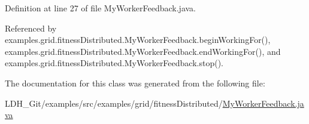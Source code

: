 Definition at line 27 of file My\-Worker\-Feedback.\-java.



Referenced by examples.\-grid.\-fitness\-Distributed.\-My\-Worker\-Feedback.\-begin\-Working\-For(), examples.\-grid.\-fitness\-Distributed.\-My\-Worker\-Feedback.\-end\-Working\-For(), and examples.\-grid.\-fitness\-Distributed.\-My\-Worker\-Feedback.\-stop().



The documentation for this class was generated from the following file\-:\begin{DoxyCompactItemize}
\item 
L\-D\-H\-\_\-\-Git/examples/src/examples/grid/fitness\-Distributed/\hyperlink{_my_worker_feedback_8java}{My\-Worker\-Feedback.\-java}\end{DoxyCompactItemize}
